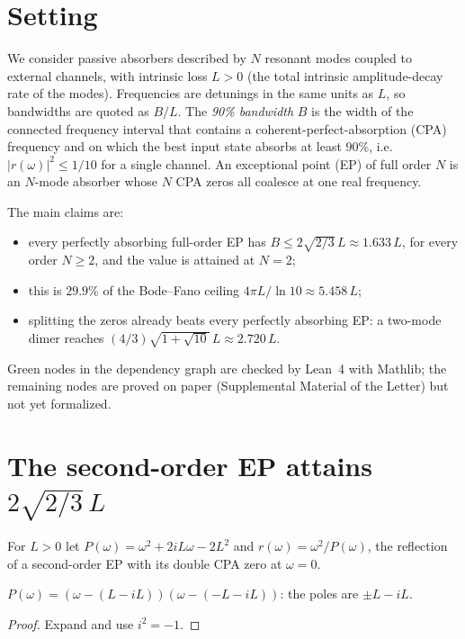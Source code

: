 \chapter{Setting}

We consider passive absorbers described by $N$ resonant modes coupled to external channels,
with intrinsic loss $L>0$ (the total intrinsic amplitude-decay rate of the modes).
Frequencies are detunings in the same units as $L$, so bandwidths are quoted as $B/L$.
The \emph{90\% bandwidth} $B$ is the width of the connected frequency interval that contains a
coherent-perfect-absorption (CPA) frequency and on which the best input state absorbs at least
90\%, i.e.\ $|r(\omega)|^2\le 1/10$ for a single channel.
An exceptional point (EP) of full order $N$ is an $N$-mode absorber whose $N$ CPA zeros all
coalesce at one real frequency.

The main claims are:
\begin{itemize}
  \item every perfectly absorbing full-order EP has $B\le 2\sqrt{2/3}\,L\approx 1.633\,L$, for every
        order $N\ge2$, and the value is attained at $N=2$;
  \item this is $29.9\%$ of the Bode--Fano ceiling $4\pi L/\ln 10\approx 5.458\,L$;
  \item splitting the zeros already beats every perfectly absorbing EP: a two-mode dimer reaches
        $(4/3)\sqrt{1+\sqrt{10}}\,L\approx 2.720\,L$.
\end{itemize}
Green nodes in the dependency graph are checked by Lean~4 with Mathlib; the remaining nodes are
proved on paper (Supplemental Material of the Letter) but not yet formalized.

\chapter{The second-order EP attains $2\sqrt{2/3}\,L$}

\begin{definition}\label{def:P2}
\leanok
For $L>0$ let $P(\omega)=\omega^2+2iL\omega-2L^2$ and $r(\omega)=\omega^2/P(\omega)$, the reflection
of a second-order EP with its double CPA zero at $\omega=0$.
\end{definition}

\begin{lemma}\label{lem:P2_factor}
\leanok
{}
$P(\omega)=(\omega-(L-iL))(\omega-(-L-iL))$: the poles are $\pm L-iL$.
\end{lemma}
\begin{proof}\leanok
Expand and use $i^2=-1$.
\end{proof}

